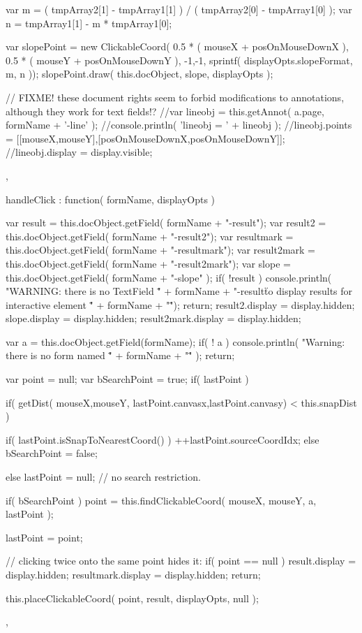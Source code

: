 {{		var m =  ( tmpArray2[1] - tmpArray1[1] ) / ( tmpArray2[0] - tmpArray1[0] );
		var n =  tmpArray1[1] - m * tmpArray1[0];

		var slopePoint = new ClickableCoord(
			0.5 * ( mouseX + posOnMouseDownX ),
			0.5 * ( mouseY + posOnMouseDownY ),
			-1,-1,
			sprintf( displayOpts.slopeFormat, m, n ));
		slopePoint.draw(
			this.docObject,
			slope,
			displayOpts );

		// FIXME! these document rights seem to forbid modifications to annotations, although they work for text fields!?
		//var lineobj = this.getAnnot( a.page, formName + '-line' );
		//console.println( 'lineobj = ' + lineobj );
		//lineobj.points = [[mouseX,mouseY],[posOnMouseDownX,posOnMouseDownY]];
		//lineobj.display = display.visible;
	},

	handleClick : function( formName, displayOpts )
	{
		var result = this.docObject.getField( formName + "-result");
		var result2 = this.docObject.getField( formName + "-result2");
		var resultmark = this.docObject.getField( formName + "-resultmark");
		var result2mark = this.docObject.getField( formName + "-result2mark");
		var slope 	= this.docObject.getField( formName + "-slope" );
		if( !result ) {
			console.println( "WARNING: there is no TextField \"" + formName + "-result\" to display results for interactive element \"" + formName + "\"");
			return;
		}
		result2.display = display.hidden;
		slope.display = display.hidden;
		result2mark.display = display.hidden;

		var a = this.docObject.getField(formName);
		if( ! a ) {
			console.println( "Warning: there is no form named \"" + formName + "\"" );
			return;
		}

		var point = null;
		var bSearchPoint = true;
		if( lastPoint ) {
			if( getDist( mouseX,mouseY,  lastPoint.canvasx,lastPoint.canvasy) < this.snapDist ) {
				if( lastPoint.isSnapToNearestCoord() )
					++lastPoint.sourceCoordIdx;
				else
					bSearchPoint = false;

			} else
				lastPoint = null; // no search restriction.
		}
		if( bSearchPoint )
			point = this.findClickableCoord( mouseX, mouseY, a, lastPoint );

		lastPoint = point;

		// clicking twice onto the same point hides it:
		if( point == null ) {
			result.display = display.hidden;
			resultmark.display = display.hidden;
			return;
		}

		this.placeClickableCoord(
			point,
			result, displayOpts, null );
	},

}
